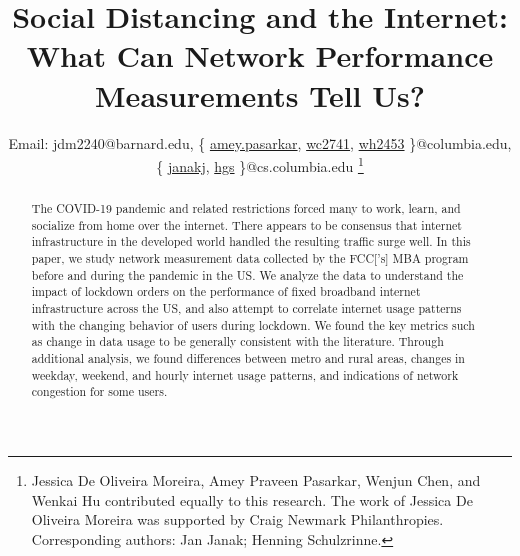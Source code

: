 \documentclass[conference,10pt]{IEEEtran}
\newcommand{\papertitle}{Social Distancing and the Internet: What Can Network Performance Measurements Tell Us?}
\begin{document}
\title{\papertitle}

\author{
    Email:
    jdm2240@barnard.edu,
    \{%
      \href{mailto:amey.pasarkar@columbia.edu}{\color{black}amey.pasarkar},%
      \href{mailto:wc2741@columbia.edu}{\color{black}wc2741},%
      \href{mailto:wh2453@columbia.edu}{\color{black}wh2453}%
    \}@columbia.edu,
    \{%
      \href{mailto:janakj@cs.columbia.edu}{\color{black}janakj},%
      \href{mailto:hgs@cs.columbia.edu}{\color{black}hgs}%
    \}@cs.columbia.edu%
    \thanks{Jessica De Oliveira Moreira, Amey Praveen Pasarkar, Wenjun Chen, and Wenkai Hu contributed equally to this research. The work of Jessica De Oliveira Moreira was supported by Craig Newmark Philanthropies. Corresponding authors: Jan Janak; Henning Schulzrinne.}
}

\maketitle

\begin{abstract}
The COVID-19 pandemic and related restrictions forced many to work, learn, and socialize from home over the internet. There appears to be consensus that internet infrastructure in the developed world handled the resulting traffic surge well. In this paper, we study network measurement data collected by the \glsdesc{FCC}['s] \glsdesc{MBA} program before and during the pandemic in the \gls{US}. We analyze the data to understand the impact of lockdown orders on the performance of fixed broadband internet infrastructure across the US, and also attempt to correlate internet usage patterns with the changing behavior of users during lockdown. We found the key metrics such as change in data usage to be generally consistent with the literature. Through additional analysis, we found differences between metro and rural areas, changes in weekday, weekend, and hourly internet usage patterns, and indications of network congestion for some users.


\end{abstract}
\end{document}
